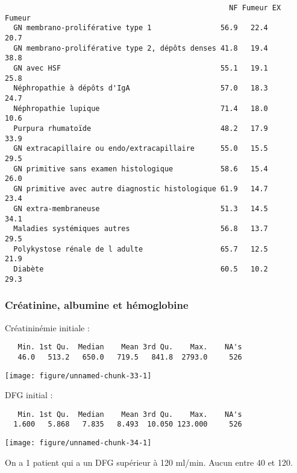 \documentclass[11pt,a4paper]{article}\usepackage[]{graphicx}\usepackage[]{color}
\makeatletter
\def\maxwidth{ %
  \ifdim\Gin@nat@width>\linewidth
    \linewidth
  \else
    \Gin@nat@width
  \fi
}
\newenvironment{kframe}{%
 \def\at@end@of@kframe{}%
 \ifinner\ifhmode%
  \def\at@end@of@kframe{\end{minipage}}%
  \begin{minipage}{\columnwidth}%
 \fi\fi%
 \def\FrameCommand##1{\hskip\@totalleftmargin \hskip-\fboxsep
 \colorbox{shadecolor}{##1}\hskip-\fboxsep
     \hskip-\linewidth \hskip-\@totalleftmargin \hskip\columnwidth}%
 \MakeFramed {\advance\hsize-\width
   \@totalleftmargin\z@ \linewidth\hsize
   \@setminipage}}%
 {\par\unskip\endMakeFramed%
 \at@end@of@kframe}
\newenvironment{knitrout}{}{} %
\makeatother
\begin{document}
\begin{knitrout}
\begin{kframe}
\begin{verbatim}
                                                    NF Fumeur EX Fumeur
  GN membrano-proliférative type 1                56.9   22.4      20.7
  GN membrano-proliférative type 2, dépôts denses 41.8   19.4      38.8
  GN avec HSF                                     55.1   19.1      25.8
  Néphropathie à dépôts d'IgA                     57.0   18.3      24.7
  Néphropathie lupique                            71.4   18.0      10.6
  Purpura rhumatoïde                              48.2   17.9      33.9
  GN extracapillaire ou endo/extracapillaire      55.0   15.5      29.5
  GN primitive sans examen histologique           58.6   15.4      26.0
  GN primitive avec autre diagnostic histologique 61.9   14.7      23.4
  GN extra-membraneuse                            51.3   14.5      34.1
  Maladies systémiques autres                     56.8   13.7      29.5
  Polykystose rénale de l adulte                  65.7   12.5      21.9
  Diabète                                         60.5   10.2      29.3
\end{verbatim}
\end{kframe}
\end{knitrout}

    \subsubsection{Créatinine, albumine et hémoglobine}

Créatininémie initiale :

\begin{knitrout}
\color{fgcolor}\begin{kframe}
\begin{verbatim}
   Min. 1st Qu.  Median    Mean 3rd Qu.    Max.    NA's 
   46.0   513.2   650.0   719.5   841.8  2793.0     526 
\end{verbatim}
\end{kframe}
\texttt{[image: figure/unnamed-chunk-33-1]} 

\end{knitrout}

DFG initial :


\begin{knitrout}
\color{fgcolor}\begin{kframe}
\begin{verbatim}
   Min. 1st Qu.  Median    Mean 3rd Qu.    Max.    NA's 
  1.600   5.868   7.835   8.493  10.050 123.000     526 
\end{verbatim}
\end{kframe}
\texttt{[image: figure/unnamed-chunk-34-1]} 

\end{knitrout}
On a 1 patient qui a un DFG supérieur à 120 ml/min. Aucun entre 40 et 120.
\end{document}
